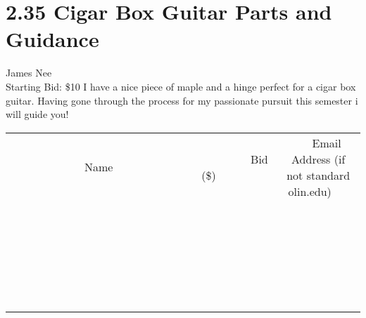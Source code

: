 \documentclass[11pt]{article}
\begin{document}
\section*{2.35 Cigar Box Guitar Parts and Guidance}
James Nee
\\
Starting Bid: \$10
\newline
I have a nice piece of maple and a hinge perfect for a cigar box guitar. Having gone through the process for my passionate pursuit this semester i will guide you!
\\[6ex]
\begin{tabular}{c c c}
~~~~~~~~~~~~~Name~~~~~~~~~~~~~ & ~~~~~~~~~Bid (\$)~~~~~~~~~  & ~~~Email Address (if not standard olin.edu)~~~\\
 & & \\
\hline
 & & \\
\hline
 & & \\
\hline
 & & \\
\hline
 & & \\
\hline
 & & \\
\hline
 & & \\
\hline
 & & \\
\hline
 & & \\
\hline
 & & \\
\hline
 & & \\
\hline
 & & \\
\hline
 & & \\
\hline
 & & \\
\hline
 & & \\
\hline
 & & \\
\hline
 & & \\
\hline
 & & \\
\hline
 & & \\
\hline
 & & \\
\hline
 & & \\
\hline
 & & \\
\hline
 & & \\
\hline
 & & \\
\hline
 & & \\
\hline
 & & \\
\hline
\end{tabular}
\newpage
\end{document}
